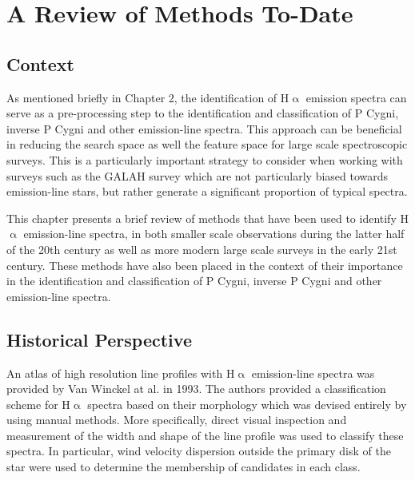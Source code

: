 \chapter{A Review of Methods To-Date}

\section{Context}
As mentioned briefly in Chapter 2, the identification of H$\upalpha$ emission spectra can serve as a pre-processing step to the identification and classification of P Cygni, inverse P Cygni and other emission-line spectra. This approach can be beneficial in reducing the search space as well the feature space for large scale spectroscopic surveys. This is a particularly important strategy to consider when working with surveys such as the GALAH survey which are not particularly biased towards emission-line stars, but rather generate a significant proportion of typical spectra.  

This chapter presents a brief review of methods that have been used to identify H$\upalpha$ emission-line spectra, in both smaller scale observations during the latter half of the 20th century as well as more modern large scale surveys in the early 21st century. These methods have also been placed in the context of their importance in the identification and classification of P Cygni, inverse P Cygni and other emission-line spectra.

\section{Historical Perspective}
An atlas of high resolution line profiles with H$\upalpha$ emission-line spectra was provided by Van Winckel at al. in 1993\cite{van1993atlas}. The authors provided a classification scheme for H$\upalpha$ spectra based on their morphology which was devised entirely by using manual methods. More specifically, direct visual inspection and measurement of the width and shape of the line profile was used to classify these spectra. In particular, wind velocity dispersion outside the primary disk of the star were used to determine the membership of candidates in each class.

